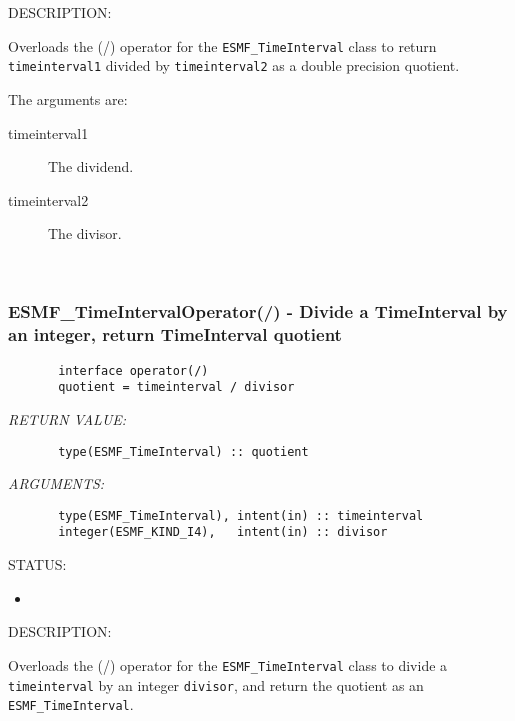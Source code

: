 {\sf DESCRIPTION:\\ }


       \begin{sloppypar}
       Overloads the (/) operator for the {\tt ESMF\_TimeInterval} class to
       return {\tt timeinterval1} divided by {\tt timeinterval2} as a
       double precision quotient.
       \end{sloppypar}
  
       The arguments are:
       \begin{description}
       \item[timeinterval1]
            The dividend.
       \item[timeinterval2]
            The divisor.
       \end{description}
   
 
\mbox{}\hrulefill\ 
 
\subsubsection [ESMF\_TimeIntervalOperator(/)] {ESMF\_TimeIntervalOperator(/) - Divide a TimeInterval by an integer, return TimeInterval quotient }


  
\begin{verbatim}       interface operator(/)
       quotient = timeinterval / divisor\end{verbatim}{\em RETURN VALUE:}
\begin{verbatim}       type(ESMF_TimeInterval) :: quotient\end{verbatim}{\em ARGUMENTS:}
\begin{verbatim}       type(ESMF_TimeInterval), intent(in) :: timeinterval
       integer(ESMF_KIND_I4),   intent(in) :: divisor\end{verbatim}
{\sf STATUS:}
   \begin{itemize}
   \item{}
   \end{itemize}
  
{\sf DESCRIPTION:\\ }


       Overloads the (/) operator for the {\tt ESMF\_TimeInterval} class to
       divide a {\tt timeinterval} by an integer {\tt divisor}, and
       return the quotient as an {\tt ESMF\_TimeInterval}.
  
